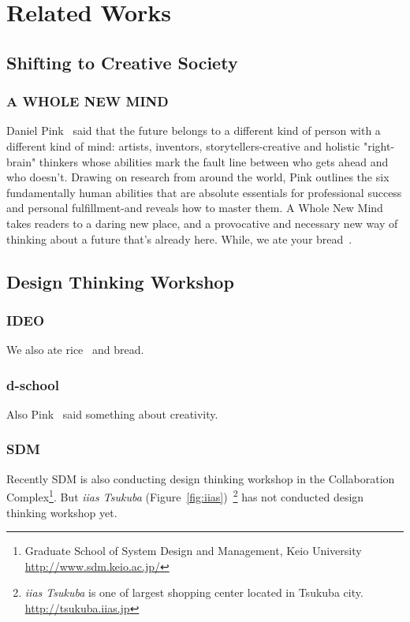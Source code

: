 
\chapter{Related Works}
\label{related}

\ifCHICAGO 
   \makeendnotes 
\fi

\section{Shifting to Creative Society}
\subsection{A WHOLE NEW MIND}

Daniel Pink~\cite{Pink2006} said that the future belongs
to a different kind of person with a different kind of mind:
artists, inventors, storytellers-creative and holistic "right-brain" thinkers
whose abilities mark the fault line between who gets ahead and who doesn't.
Drawing on research from around the world,
Pink outlines the six fundamentally human abilities
that are absolute essentials for professional success and
personal fulfillment-and reveals how to master them.
A Whole New Mind takes readers to a daring new place,
and a provocative and necessary new way of thinking about a future
that's already here.
While, we ate your bread~\cite{Sugiura2012,Uriu2012}.

\section{Design Thinking Workshop}
\subsection{IDEO}
We also ate rice~\cite{Tokuhisa2009} and bread.

\subsection{d-school}
Also Pink~\cite{Pink2006} said something about creativity.


\subsection{SDM}
Recently SDM is also conducting design thinking workshop in
the Collaboration Complex\footnote{Graduate School of System Design
  and Management, Keio University \\\url{http://www.sdm.keio.ac.jp/}}.
But {\it iias Tsukuba} (Figure~\ref{fig:iias})~\footnote{{\it iias Tsukuba}
is one of largest shopping center located in Tsukuba city.
\url{http://tsukuba.iias.jp}}
has not conducted design thinking workshop yet. 


